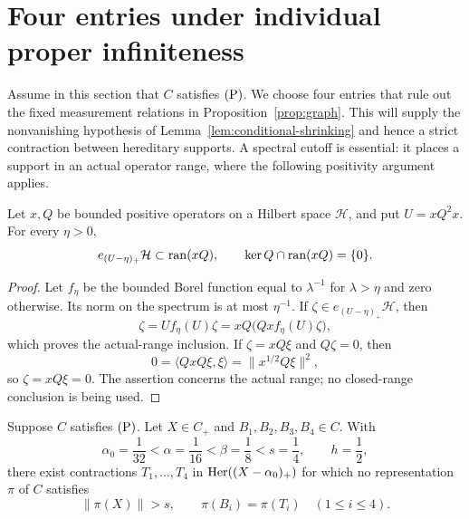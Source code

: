\section{Four entries under individual proper infiniteness}
\label{sec:four-variables}

Assume in this section that \(C\) satisfies \(\textup{(P)}\).
We choose four entries that rule out the fixed measurement relations
in Proposition~\ref{prop:graph}.  This will supply the nonvanishing
hypothesis of Lemma~\ref{lem:conditional-shrinking} and hence a
strict contraction between hereditary supports.  A spectral cutoff
is essential: it places a support in an actual operator range, where
the following positivity argument applies.

\begin{lemma}\label{lem:actual-range}
Let \(x,Q\) be bounded positive operators on a Hilbert space
\(\mathcal H\), and put \(U=xQ^2x\).  For every \(\eta>0\),
\begin{equation}\label{eq:actual-range}
 e_{(U-\eta)_+}\mathcal H\subset\operatorname{ran}(xQ),
 \qquad
 \ker Q\cap\operatorname{ran}(xQ)=\{0\}.
\end{equation}
\end{lemma}

\begin{proof}
Let \(f_\eta\) be the bounded Borel function equal to
\(\lambda^{-1}\) for \(\lambda>\eta\) and zero otherwise.
Its norm on the spectrum is at most \(\eta^{-1}\).  If
\(\zeta\in e_{(U-\eta)_+}\mathcal H\), then
\[
 \zeta=Uf_\eta(U)\zeta
      =xQ\bigl(Qx f_\eta(U)\zeta\bigr),
\]
which proves the actual-range inclusion.  If
\(\zeta=xQ\xi\) and \(Q\zeta=0\), then
\[
 0=\langle QxQ\xi,\xi\rangle=\|x^{1/2}Q\xi\|^2,
\]
so \(\zeta=xQ\xi=0\).  The assertion concerns the actual range;
no closed-range conclusion is being used.
\end{proof}

\begin{proposition}
\label{prop:four-avoidance}
Suppose \(C\) satisfies \(\textup{(P)}\).  Let \(X\in C_+\) and
\(B_1,B_2,B_3,B_4\in C\).  With
\[
 \alpha_0=\frac1{32}<\alpha=\frac1{16}
 <\beta=\frac18<s=\frac14,\qquad h=\frac12,
\]
there exist contractions \(T_1,\ldots,T_4\) in
\(\operatorname{Her}((X-\alpha_0)_+)\) for which no representation \(\pi\)
of \(C\) satisfies
\begin{equation}\label{eq:four-forbidden}
 \|\pi(X)\|>s,\qquad \pi(B_i)=\pi(T_i)\quad(1\le i\le4).
\end{equation}
\end{proposition}

